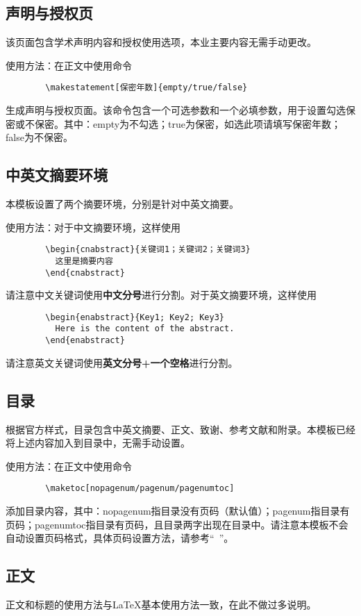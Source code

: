 \documentclass[UTF8,sub3section]{ctexart}
\begin{document}
	\subsection{声明与授权页}
	该页面包含学术声明内容和授权使用选项，本业主要内容无需手动更改。
	
	使用方法：在正文中使用命令
	\begin{verbatim}
		\makestatement[保密年数]{empty/true/false}
	\end{verbatim}
	生成声明与授权页面。该命令包含一个可选参数和一个必填参数，用于设置勾选保密或不保密。其中：empty为不勾选；true为保密，如选此项请填写保密年数；false为不保密。
	
	\subsection{中英文摘要环境}
	本模板设置了两个摘要环境，分别是针对中英文摘要。
	
	使用方法：对于中文摘要环境，这样使用
	\begin{verbatim}
		\begin{cnabstract}{关键词1；关键词2；关键词3}
		  这里是摘要内容
		\end{cnabstract}
	\end{verbatim}
	请注意中文关键词使用{\bfseries 中文分号}进行分割。对于英文摘要环境，这样使用
	\begin{verbatim}
		\begin{enabstract}{Key1; Key2; Key3}
		  Here is the content of the abstract.
		\end{enabstract}
	\end{verbatim}
	请注意英文关键词使用{\bfseries 英文分号+一个空格}进行分割。
	
	\subsection{目录}\label{subsec:toc}
	根据官方样式，目录包含中英文摘要、正文、致谢、参考文献和附录。本模板已经将上述内容加入到目录中，无需手动设置。
	
	使用方法：在正文中使用命令
	\begin{verbatim}
		\maketoc[nopagenum/pagenum/pagenumtoc]
	\end{verbatim}
	添加目录内容，其中：nopagenum指目录没有页码（默认值）；pagenum指目录有页码；pagenumtoc指目录有页码，且目录两字出现在目录中。请注意本模板不会自动设置页码格式，具体页码设置方法，请参考“{\itshape ~}”。
	
	\subsection{正文}
	正文和标题的使用方法与\LaTeX 基本使用方法一致，在此不做过多说明。
	
\end{document}
